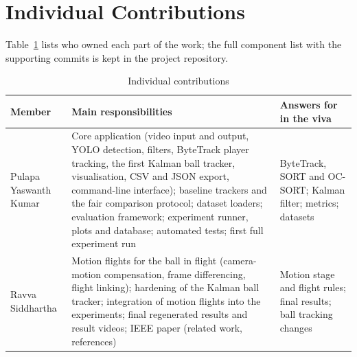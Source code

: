 \section{Individual Contributions}
Table~\ref{tab:contrib} lists who owned each part of the work; the full
component list with the supporting commits is kept in the project repository.

\begin{table}[!t]
\caption{Individual contributions}
\label{tab:contrib}
\centering
\footnotesize
\begin{tabular}{@{}p{3.4cm}p{9.2cm}p{3.6cm}@{}}
\toprule
Member & Main responsibilities & Answers for in the viva \\
\midrule
Pulapa Yaswanth Kumar & Core application (video input and output, YOLO detection, filters, ByteTrack player tracking, the first Kalman ball tracker, visualisation, CSV and JSON export, command-line interface); baseline trackers and the fair comparison protocol; dataset loaders; evaluation framework; experiment runner, plots and database; automated tests; first full experiment run & ByteTrack, SORT and OC-SORT; Kalman filter; metrics; datasets \\
Ravva Siddhartha & Motion flights for the ball in flight (camera-motion compensation, frame differencing, flight linking); hardening of the Kalman ball tracker; integration of motion flights into the experiments; final regenerated results and result videos; IEEE paper (related work, references) & Motion stage and flight rules; final results; ball tracking changes \\
\bottomrule
\end{tabular}
\end{table}

